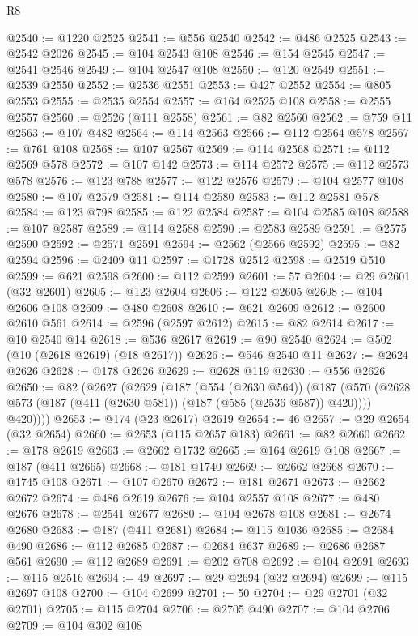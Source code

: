 \begin{lexlean}{R8}
\begin{coremodule}
@2540 := @1220 @2525
@2541 := @556 @2540
@2542 := @486 @2525
@2543 := @2542 @2026
@2545 := @104 @2543 @108
@2546 := @154 @2545
@2547 := @2541 @2546
@2549 := @104 @2547 @108
@2550 := @120 @2549
@2551 := @2539 @2550
@2552 := @2536 @2551
@2553 := @427 @2552
@2554 := @805 @2553
@2555 := @2535 @2554
@2557 := @164 @2525 @108
@2558 := @2555 @2557
@2560 := @2526 (@111 @2558)
@2561 := @82 @2560
@2562 := @759 @11
@2563 := @107 @482
@2564 := @114 @2563
@2566 := @112 @2564 @578
@2567 := @761 @108
@2568 := @107 @2567
@2569 := @114 @2568
@2571 := @112 @2569 @578
@2572 := @107 @142
@2573 := @114 @2572
@2575 := @112 @2573 @578
@2576 := @123 @788
@2577 := @122 @2576
@2579 := @104 @2577 @108
@2580 := @107 @2579
@2581 := @114 @2580
@2583 := @112 @2581 @578
@2584 := @123 @798
@2585 := @122 @2584
@2587 := @104 @2585 @108
@2588 := @107 @2587
@2589 := @114 @2588
@2590 := @2583 @2589
@2591 := @2575 @2590
@2592 := @2571 @2591
@2594 := @2562 (@2566 @2592)
@2595 := @82 @2594
@2596 := @2409 @11
@2597 := @1728 @2512
@2598 := @2519 @510
@2599 := @621 @2598
@2600 := @112 @2599
@2601 := 57
@2604 := @29 @2601 (@32 @2601)
@2605 := @123 @2604
@2606 := @122 @2605
@2608 := @104 @2606 @108
@2609 := @480 @2608
@2610 := @621 @2609
@2612 := @2600 @2610 @561
@2614 := @2596 (@2597 @2612)
@2615 := @82 @2614
@2617 := @10 @2540 @14
@2618 := @536 @2617
@2619 := @90 @2540
@2624 := @502 (@10 (@2618 @2619) (@18 @2617))
@2626 := @546 @2540 @11
@2627 := @2624 @2626
@2628 := @178 @2626
@2629 := @2628 @119
@2630 := @556 @2626
@2650 := @82
    (@2627
      (@2629
        (@187
          (@554 (@2630 @564))
          (@187
            (@570 (@2628 @573 (@187 (@411 (@2630 @581)) (@187 (@585 (@2536 @587)) @420))))
            @420))))
@2653 := @174 (@23 @2617) @2619
@2654 := 46
@2657 := @29 @2654 (@32 @2654)
@2660 := @2653 (@115 @2657 @183)
@2661 := @82 @2660
@2662 := @178 @2619
@2663 := @2662 @1732
@2665 := @164 @2619 @108
@2667 := @187 (@411 @2665)
@2668 := @181 @1740
@2669 := @2662 @2668
@2670 := @1745 @108
@2671 := @107 @2670
@2672 := @181 @2671
@2673 := @2662 @2672
@2674 := @486 @2619
@2676 := @104 @2557 @108
@2677 := @480 @2676
@2678 := @2541 @2677
@2680 := @104 @2678 @108
@2681 := @2674 @2680
@2683 := @187 (@411 @2681)
@2684 := @115 @1036
@2685 := @2684 @490
@2686 := @112 @2685
@2687 := @2684 @637
@2689 := @2686 @2687 @561
@2690 := @112 @2689
@2691 := @202 @708
@2692 := @104 @2691
@2693 := @115 @2516
@2694 := 49
@2697 := @29 @2694 (@32 @2694)
@2699 := @115 @2697 @108
@2700 := @104 @2699
@2701 := 50
@2704 := @29 @2701 (@32 @2701)
@2705 := @115 @2704
@2706 := @2705 @490
@2707 := @104 @2706
@2709 := @104 @302 @108

\end{coremodule}
\end{lexlean}

